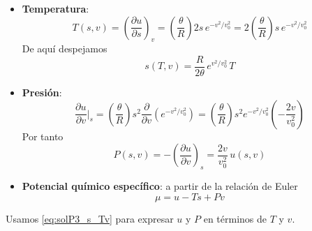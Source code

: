 \documentclass{article}
\begin{document}
\begin{itemize}
  \item[\(\bullet\)] \textcolor{Apple Green}{\textbf{Temperatura}}:
  \begin{equation}
  T(s,v)
  = \left(\frac{\partial u}{\partial s}\right)_{v}
  = \left(\frac{\theta}{R}\right) 2s\,e^{-v^{2}/v_{0}^{2}}
  = 2\left(\frac{\theta}{R}\right)s\,e^{-v^{2}/v_{0}^{2}}
  \label{eq:solP3_T_sv}
  \end{equation}
  De aquí despejamos
  \begin{equation}
  s(T,v)
  = \frac{R}{2\theta}\,e^{v^{2}/v_{0}^{2}}\,T
  \label{eq:solP3_s_Tv}
  \end{equation}

  \item[\(\bullet\)] \textcolor{Cinnabar}{\textbf{Presión}}:
  \begin{equation}
  \frac{\partial u}{\partial v}\Big|_{s}
  = \left(\frac{\theta}{R}\right)s^{2}
    \frac{\partial}{\partial v}
    \left(e^{-v^{2}/v_{0}^{2}}\right)
  = \left(\frac{\theta}{R}\right)s^{2}
    e^{-v^{2}/v_{0}^{2}}\left(-\frac{2v}{v_{0}^{2}}\right)
  \end{equation}
  Por tanto
  \begin{equation}
  P(s,v)
  = -\left(\frac{\partial u}{\partial v}\right)_{s}
  = \frac{2v}{v_{0}^{2}}\,u(s,v)
  \label{eq:solP3_P_sv}
  \end{equation}

  \item[\(\bullet\)] \textcolor{Lochinvar}{\textbf{Potencial químico específico}}:
  a partir de la relación de Euler
  \begin{equation}
  \mu = u - T s + P v
  \label{eq:solP3_mu_def}
  \end{equation}
\end{itemize}

\vspace{0.3cm}

Usamos \eqref{eq:solP3_s_Tv} para expresar \(u\) y \(P\) en términos de \(T\) y \(v\).
\end{document}
